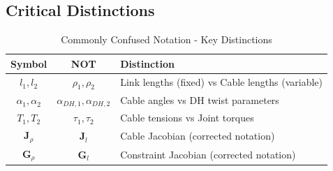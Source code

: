 \subsection{Critical Distinctions}

\begin{table}[h!]
\centering
\caption{Commonly Confused Notation - Key Distinctions}
\begin{tabular}{|c|c|l|}
\hline
\textbf{Symbol} & \textbf{NOT} & \textbf{Distinction} \\
\hline
$l_1, l_2$ & $\rho_1, \rho_2$ & Link lengths (fixed) vs Cable lengths (variable) \\
$\alpha_1, \alpha_2$ & $\alpha_{DH,1}, \alpha_{DH,2}$ & Cable angles vs DH twist parameters \\
$T_1, T_2$ & $\tau_1, \tau_2$ & Cable tensions vs Joint torques \\
$\bm{J}_{\rho}$ & $\bm{J}_l$ & Cable Jacobian (corrected notation) \\
$\bm{G}_{\rho}$ & $\bm{G}_l$ & Constraint Jacobian (corrected notation) \\
\hline
\end{tabular}
\end{table}